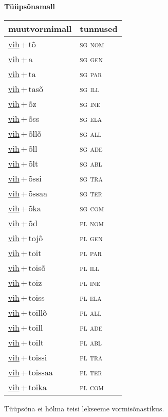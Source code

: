 
\vspace{1.8em}
\begin{minipage}{\textwidth}
\textbf{Tüüpsõnamall \,}\\

\begin{sideways}
\begin{tabular}{l l}
muutvormimall & tunnused \\
\hline
\underline{vih}\,+\,tõ & \textsc{ sg nom } \\
\underline{vih}\,+\,a & \textsc{ sg gen } \\
\underline{vih}\,+\,ta & \textsc{ sg par } \\
\underline{vih}\,+\,tasõ & \textsc{ sg ill } \\
\underline{vih}\,+\,õz & \textsc{ sg ine } \\
\underline{vih}\,+\,õss & \textsc{ sg ela } \\
\underline{vih}\,+\,õllõ & \textsc{ sg all } \\
\underline{vih}\,+\,õll & \textsc{ sg ade } \\
\underline{vih}\,+\,õlt & \textsc{ sg abl } \\
\underline{vih}\,+\,õssi & \textsc{ sg tra } \\
\underline{vih}\,+\,õssaa & \textsc{ sg ter } \\
\underline{vih}\,+\,õka & \textsc{ sg com } \\
\underline{vih}\,+\,õd & \textsc{ pl nom } \\
\underline{vih}\,+\,tojõ & \textsc{ pl gen } \\
\underline{vih}\,+\,toit & \textsc{ pl par } \\
\underline{vih}\,+\,toisõ & \textsc{ pl ill } \\
\underline{vih}\,+\,toiz & \textsc{ pl ine } \\
\underline{vih}\,+\,toiss & \textsc{ pl ela } \\
\underline{vih}\,+\,toillõ & \textsc{ pl all } \\
\underline{vih}\,+\,toill & \textsc{ pl ade } \\
\underline{vih}\,+\,toilt & \textsc{ pl abl } \\
\underline{vih}\,+\,toissi & \textsc{ pl tra } \\
\underline{vih}\,+\,toissaa & \textsc{ pl ter } \\
\underline{vih}\,+\,toika & \textsc{ pl com } \\
\end{tabular}
\end{sideways}
\label{tab:tüüpsõnamall-vihtõ}

\end{minipage}

 
\vspace{1em}
\noindent Tüüpsõna ei hõlma teisi lekseeme vormi\-sõnastikus.
